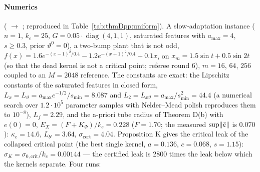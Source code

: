\paragraph{Numerics} ( $\to$ ; reproduced in
Table~\ref{tab:thmDpp:uniform}). A slow-adaptation instance ($n = 1$, $k_e = 25$, $G = 0.05\cdot\operatorname{diag}(4,1,1)$, saturated features with $a_{\max} = 4$,
$s \ge 0.3$, prior $\vartheta^0 = 0$), a two-bump plant that is not odd,
$f(x) = 1.6e^{-(x-1)^2/0.4} - 1.2e^{-(x+1)^2/0.4} + 0.1x$, on $x_m = 1.5\sin t + 0.5\sin2t$ (so that the dead kernel
is not a critical point; referee round 6), $m = 16$, $64$, $256$ coupled to an $M = 2048$ reference. The constants are
exact: the Lipschitz constants of the saturated features in closed form,
$L_x = L_\vartheta = a_{\max}e^{-1/2}/s_{\min} = 8.087$ and $L_2 = L_{x\vartheta} = a_{\max}/s_{\min}^2 = 44.4$ (a
numerical search over $1.2\cdot10^5$ parameter samples with Nelder--Mead polish reproduces them to $10^{-8}$),
$L_f = 2.29$, and the a-priori tube radius of Theorem D(b) with $e(0) = 0$, $E_X = (F + K_\Phi)/k_e = 0.228$
($F = 1.70$; the measured $\sup\lVert \bar e\rVert$ is $0.070$): $\kappa_e = 14.6$, $L_{b'} = 3.64$,
$\sigma_{\mathrm{cert}} = 4.04$. Proposition K gives the critical leak of the collapsed critical point (the best single
kernel, $a = 0.136$, $c = 0.068$, $s = 1.15$): $\sigma_K = \sigma_{0,\mathrm{crit}}/k_e = 0.00144$ --- the certified
leak is 2800 times the leak below which the kernels separate. Four runs:

